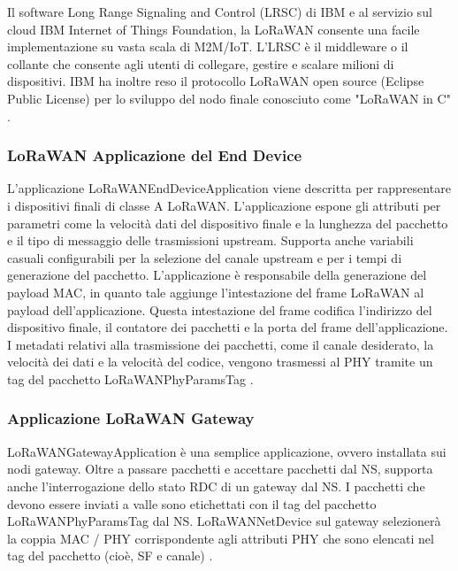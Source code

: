 \documentclass[a4paper]{report} %
\begin{document}
Il software Long Range Signaling and Control (LRSC) di IBM e al servizio sul cloud IBM Internet of Things Foundation, la LoRaWAN consente una facile implementazione su vasta scala di M2M/IoT. L'LRSC è il middleware o il collante che consente agli utenti di collegare, gestire e scalare milioni di dispositivi. IBM ha inoltre reso il protocollo LoRaWAN open source (Eclipse Public License) per lo sviluppo del nodo finale conosciuto come "LoRaWAN in C" \cite{art:rif.26}.



\subsubsection{LoRaWAN Applicazione del End Device}
L'applicazione LoRaWANEndDeviceApplication viene descritta per rappresentare i dispositivi finali di classe A LoRaWAN. L'applicazione espone gli attributi per parametri come la velocità dati del dispositivo finale e la lunghezza del pacchetto e il tipo di messaggio delle trasmissioni upstream. Supporta anche variabili casuali configurabili per la selezione del canale upstream e per i tempi di generazione del pacchetto. L'applicazione è responsabile della generazione del payload MAC, in quanto tale aggiunge l'intestazione del frame LoRaWAN al payload dell'applicazione. Questa intestazione del frame codifica l'indirizzo del dispositivo finale, il contatore dei pacchetti e la porta del frame dell'applicazione. I metadati relativi alla trasmissione dei pacchetti, come il canale desiderato, la velocità dei dati e la velocità del codice, vengono trasmessi al PHY tramite un tag del pacchetto LoRaWANPhyParamsTag \cite{art:rif.49}.

\subsubsection{Applicazione LoRaWAN Gateway}
LoRaWANGatewayApplication è una semplice applicazione, ovvero installata sui nodi gateway. Oltre a passare pacchetti e accettare pacchetti dal NS, supporta anche l'interrogazione dello stato RDC di un gateway dal NS. I pacchetti che devono essere inviati a valle sono etichettati con il tag del pacchetto LoRaWANPhyParamsTag dal NS. LoRaWANNetDevice sul gateway selezionerà la coppia MAC / PHY corrispondente agli attributi PHY che sono elencati nel tag del pacchetto (cioè, SF e canale) \cite{art:rif.49}.
\end{document}
